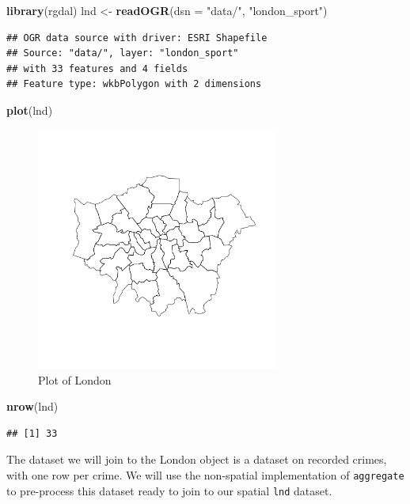 \documentclass[]{article}
\newenvironment{Shaded}{}{}
\newcommand{\KeywordTok}[1]{\textcolor[rgb]{0.00,0.44,0.13}{\textbf{{#1}}}}
\newcommand{\DataTypeTok}[1]{\textcolor[rgb]{0.56,0.13,0.00}{{#1}}}
\newcommand{\StringTok}[1]{\textcolor[rgb]{0.25,0.44,0.63}{{#1}}}
\newcommand{\NormalTok}[1]{{#1}}
\let\Oldincludegraphics\includegraphics
\renewcommand{\includegraphics}[1]{\Oldincludegraphics[width=8cm]{#1}}
\begin{document}
\begin{Shaded}
\begin{Highlighting}[]
\KeywordTok{library}\NormalTok{(rgdal)}
\NormalTok{lnd <- }\KeywordTok{readOGR}\NormalTok{(}\DataTypeTok{dsn =} \StringTok{"data/"}\NormalTok{, }\StringTok{"london_sport"}\NormalTok{)}
\end{Highlighting}
\end{Shaded}
\begin{verbatim}
## OGR data source with driver: ESRI Shapefile 
## Source: "data/", layer: "london_sport"
## with 33 features and 4 fields
## Feature type: wkbPolygon with 2 dimensions
\end{verbatim}
\begin{Shaded}
\begin{Highlighting}[]
\KeywordTok{plot}\NormalTok{(lnd)}
\end{Highlighting}
\end{Shaded}
\begin{figure}[htbp]
\centering
\includegraphics{figure/Plot_of_London.png}
\caption{Plot of London}
\end{figure}

\begin{Shaded}
\begin{Highlighting}[]
\KeywordTok{nrow}\NormalTok{(lnd)}
\end{Highlighting}
\end{Shaded}
\begin{verbatim}
## [1] 33
\end{verbatim}
The dataset we will join to the London object is a dataset on recorded
crimes, with one row per crime. We will use the non-spatial
implementation of \texttt{aggregate} to pre-process this dataset ready
to join to our spatial \texttt{lnd} dataset.
\end{document}
